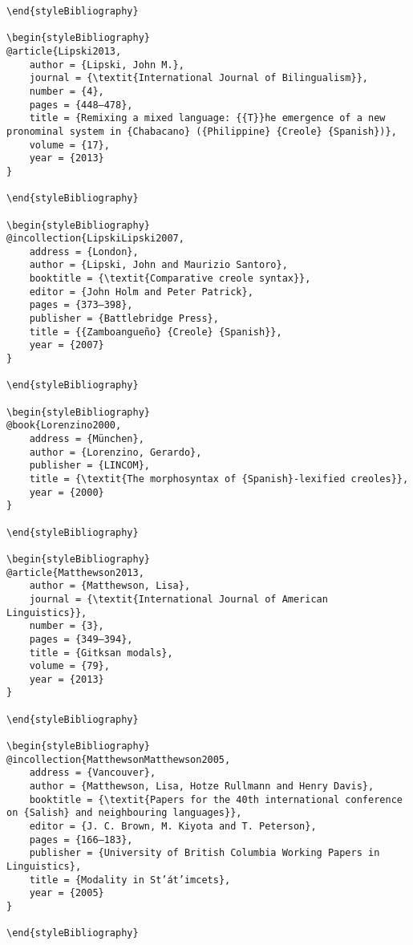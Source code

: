 \begin{stylelsUnNumberedSection}
\begin{verbatim}
\end{styleBibliography}

\begin{styleBibliography}
@article{Lipski2013,
	author = {Lipski, John M.},
	journal = {\textit{International Journal of Bilingualism}},
	number = {4},
	pages = {448–478},
	title = {Remixing a mixed language: {{T}}he emergence of a new pronominal system in {Chabacano} ({Philippine} {Creole} {Spanish})},
	volume = {17},
	year = {2013}
}

\end{styleBibliography}

\begin{styleBibliography}
@incollection{LipskiLipski2007,
	address = {London},
	author = {Lipski, John and Maurizio Santoro},
	booktitle = {\textit{Comparative creole syntax}},
	editor = {John Holm and Peter Patrick},
	pages = {373–398},
	publisher = {Battlebridge Press},
	title = {{Zamboangueño} {Creole} {Spanish}},
	year = {2007}
}

\end{styleBibliography}

\begin{styleBibliography}
@book{Lorenzino2000,
	address = {München},
	author = {Lorenzino, Gerardo},
	publisher = {LINCOM},
	title = {\textit{The morphosyntax of {Spanish}-lexified creoles}},
	year = {2000}
}

\end{styleBibliography}

\begin{styleBibliography}
@article{Matthewson2013,
	author = {Matthewson, Lisa},
	journal = {\textit{International Journal of American Linguistics}},
	number = {3},
	pages = {349–394},
	title = {Gitksan modals},
	volume = {79},
	year = {2013}
}

\end{styleBibliography}

\begin{styleBibliography}
@incollection{MatthewsonMatthewson2005,
	address = {Vancouver},
	author = {Matthewson, Lisa, Hotze Rullmann and Henry Davis},
	booktitle = {\textit{Papers for the 40th international conference on {Salish} and neighbouring languages}},
	editor = {J. C. Brown, M. Kiyota and T. Peterson},
	pages = {166–183},
	publisher = {University of British Columbia Working Papers in Linguistics},
	title = {Modality in St’át’imcets},
	year = {2005}
}

\end{styleBibliography}


\end{verbatim}
\end{stylelsUnNumberedSection}
